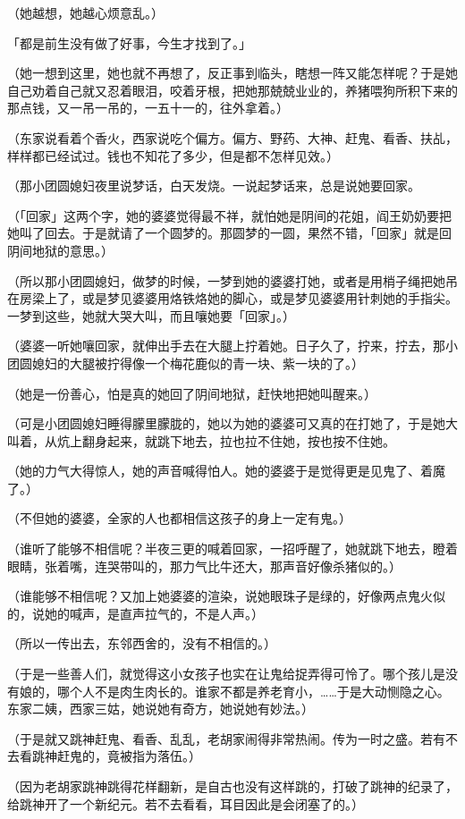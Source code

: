 \documentclass[UTF8]{ctexart}
\begin{document}
（她越想，她越心烦意乱。）

{「都是前生没有做了好事，今生才找到了。」}

（她一想到这里，她也就不再想了，反正事到临头，瞎想一阵又能怎样呢？于是她自己劝着自己就又忍着眼泪，咬着牙根，把她那兢兢业业的，养猪喂狗所积下来的那点钱，又一吊一吊的，一五十一的，往外拿着。）

（东家说看着个香火，西家说吃个偏方。偏方、野药、大神、赶鬼、看香、扶乩，样样都已经试过。钱也不知花了多少，但是都不怎样见效。）

（那小团圆媳妇夜里说梦话，白天发烧。一说起梦话来，总是说她要回家。

（「回家」这两个字，她的婆婆觉得最不祥，就怕她是阴间的花姐，阎王奶奶要把她叫了回去。于是就请了一个圆梦的。那圆梦的一圆，果然不错，「回家」就是回阴间地狱的意思。）

（所以那小团圆媳妇，做梦的时候，一梦到她的婆婆打她，或者是用梢子绳把她吊在房梁上了，或是梦见婆婆用烙铁烙她的脚心，或是梦见婆婆用针刺她的手指尖。一梦到这些，她就大哭大叫，而且嚷她要「回家」。）

（婆婆一听她嚷回家，就伸出手去在大腿上拧着她。日子久了，拧来，拧去，那小团圆媳妇的大腿被拧得像一个梅花鹿似的青一块、紫一块的了。）

（她是一份善心，怕是真的她回了阴间地狱，赶快地把她叫醒来。）

（可是小团圆媳妇睡得朦里朦胧的，她以为她的婆婆可又真的在打她了，于是她大叫着，从炕上翻身起来，就跳下地去，拉也拉不住她，按也按不住她。

（她的力气大得惊人，她的声音喊得怕人。她的婆婆于是觉得更是见鬼了、着魔了。）

（不但她的婆婆，全家的人也都相信这孩子的身上一定有鬼。）

（谁听了能够不相信呢？半夜三更的喊着回家，一招呼醒了，她就跳下地去，瞪着眼睛，张着嘴，连哭带叫的，那力气比牛还大，那声音好像杀猪似的。）

（谁能够不相信呢？又加上她婆婆的渲染，说她眼珠子是绿的，好像两点鬼火似的，说她的喊声，是直声拉气的，不是人声。）

（所以一传出去，东邻西舍的，没有不相信的。）

（于是一些善人们，就觉得这小女孩子也实在让鬼给捉弄得可怜了。哪个孩儿是没有娘的，哪个人不是肉生肉长的。谁家不都是养老育小，……于是大动恻隐之心。东家二姨，西家三姑，她说她有奇方，她说她有妙法。）

（于是就又跳神赶鬼、看香、乱乱，老胡家闹得非常热闹。传为一时之盛。若有不去看跳神赶鬼的，竟被指为落伍。）

（因为老胡家跳神跳得花样翻新，是自古也没有这样跳的，打破了跳神的纪录了，给跳神开了一个新纪元。若不去看看，耳目因此是会闭塞了的。）
\end{document}
